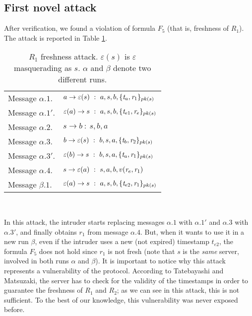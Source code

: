 \documentclass{entcs} \usepackage{entcsmacro}
\newcommand{\INT}{\ensuremath{\varepsilon}}
\begin{document}
\subsection{First novel attack}
After verification, we found a violation of formula $F_5$ 
(that is, freshness of $R_1$). The attack is reported in Table \ref{es_2}.
\begin{table} [h]
\begin{center}
\caption{\label{es_2}  $R_1$ freshness attack. $\varepsilon(s)$ is $\varepsilon$ masquerading as $s$.  $\alpha$ and $\beta$ denote two different runs.}
\begin{tabular}{l l} \hline 
Message $\alpha.1 $.&$ a \rightarrow \INT(s) \ : \ a,s,b, \{\emph{t}_a, \emph{r}_1\}_{pk(s)} $ \\
Message $\alpha.1'$.&$ \INT(a) \rightarrow s \ : \ a,s,b, \{\emph{t}_{e1}, \emph{r}_e\}_{pk(s)} $ \\
Message $\alpha.2 $.&$ s \rightarrow b \ : \ s,b,a $ \\
Message $\alpha.3 $.&$ b \rightarrow \INT(s) \ : \ b,s,a, \{\emph{t}_b, \emph{r}_2\}_{pk(s)} $ \\
Message $\alpha.3'$.&$ \INT(b) \rightarrow s \ : \ b,s,a, \{\emph{t}_a, \emph{r}_1\}_{pk(s)} $ \\
Message $\alpha.4 $.&$ s \rightarrow \INT(a) \ : \ s,a,b, v(\emph{r}_e,\emph{r}_1) $ \\
Message $\beta.1$.&$ \INT(a) \rightarrow s \ : \ a,s,b, \{\emph{t}_{e2}, \emph{r}_1\}_{pk(s)} $ \\
\hline
\end{tabular}\\
\end{center}
\end{table}

In this attack, the intruder starts replacing messages $\alpha.1$ with
$\alpha.1'$ and $\alpha.3$ with $\alpha.3'$, and finally obtains $r_1$
from message $\alpha.4$. But, when it wants to use it in a new run
$\beta$, even if the intruder uses a new (not expired) timestamp $t_{e2}$, the
formula $F_5$ does not hold since $r_1$ is not fresh (note that $s$ is
the \emph{same} server, involved in both runs $\alpha$ and $\beta$).
It is important to notice why this attack represents a
vulnerability of the protocol. According to Tatebayashi and Matsuzaki,
the server has to check for the validity of the timestamps in order
to guarantee the freshness of $R_1$ and $R_2$; as we can see in this
attack, this is not sufficient.  To the best of our knowledge, this
vulnerability was never exposed before.\\
\end{document}
